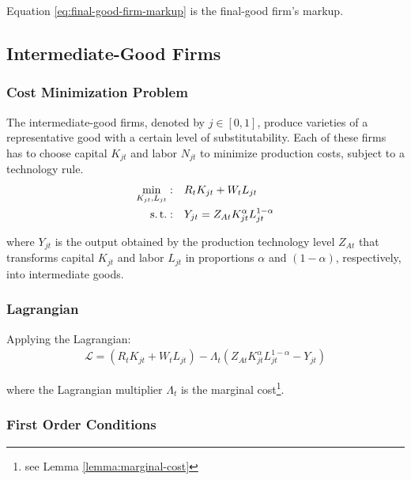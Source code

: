 \documentclass[
	thesis.tex
	]{subfiles}
\begin{document}
Equation \ref{eq:final-good-firm-markup} is the final-good firm's markup.


\subsection{Intermediate-Good Firms}

\subsubsection*{Cost Minimization Problem}

The intermediate-good firms, denoted by $j \in [0,1]$, produce varieties of a representative good with a certain level of substitutability. Each of these firms has to choose capital $K_{jt}$ and labor $N_{jt}$ to minimize production costs, subject to a technology rule.
\begin{align}
	\label{eq:int-good-firm-total-cost}
	\min_{K_{jt}, L_{jt}}: \quad & R_t K_{jt} + W_t L_{jt} \\
	\label{eq:int-good-firm-production-function}
	\operatorname{s.t.}: \quad & Y_{jt} = Z_{At} K_{jt}^\alpha L_{jt}^{1-\alpha}
\end{align}

where $Y_{jt}$ is the output obtained by the production technology level $Z_{At}$\footnotemark{} that transforms capital $K_{jt}$ and labor $L_{jt}$ in proportions $\alpha$ and $(1-\alpha)$, respectively, into intermediate goods.


\subsubsection*{Lagrangian}

Applying the Lagrangian:
\begin{align}
	\label{eq:int-good-firm-lagrangian}
	\mathcal{L} = (R_t K_{jt} + W_t L_{jt}) - \Lambda_t (Z_{At} K_{jt}^\alpha L_{jt}^{1-\alpha} - Y_{jt})
\end{align}

where the Lagrangian multiplier $\Lambda_t$ is the marginal cost\footnote{see Lemma \ref{lemma:marginal-cost}}.

\subsubsection*{First Order Conditions}
\end{document}
